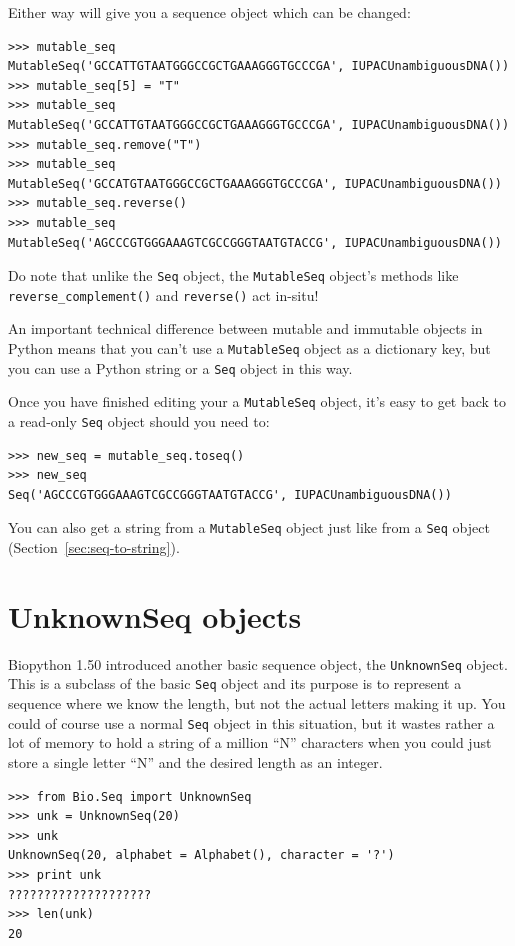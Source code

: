 \documentclass{report}
\begin{document}
Either way will give you a sequence object which can be changed:
\begin{verbatim}
>>> mutable_seq
MutableSeq('GCCATTGTAATGGGCCGCTGAAAGGGTGCCCGA', IUPACUnambiguousDNA())
>>> mutable_seq[5] = "T"
>>> mutable_seq
MutableSeq('GCCATTGTAATGGGCCGCTGAAAGGGTGCCCGA', IUPACUnambiguousDNA())
>>> mutable_seq.remove("T")
>>> mutable_seq
MutableSeq('GCCATGTAATGGGCCGCTGAAAGGGTGCCCGA', IUPACUnambiguousDNA())
>>> mutable_seq.reverse()
>>> mutable_seq
MutableSeq('AGCCCGTGGGAAAGTCGCCGGGTAATGTACCG', IUPACUnambiguousDNA())
\end{verbatim}

Do note that unlike the \verb|Seq| object, the \verb|MutableSeq| object's methods like \verb|reverse_complement()| and \verb|reverse()| act in-situ!

An important technical difference between mutable and immutable objects in Python means that you can't use a \verb|MutableSeq| object as a dictionary key, but you can use a Python string or a \verb|Seq| object in this way.

Once you have finished editing your a \verb|MutableSeq| object, it's easy to get back to a read-only \verb|Seq| object should you need to:

\begin{verbatim}
>>> new_seq = mutable_seq.toseq()
>>> new_seq
Seq('AGCCCGTGGGAAAGTCGCCGGGTAATGTACCG', IUPACUnambiguousDNA())
\end{verbatim}

You can also get a string from a \verb|MutableSeq| object just like from a \verb|Seq| object (Section~\ref{sec:seq-to-string}).

\section{UnknownSeq objects}
Biopython 1.50 introduced another basic sequence object, the \verb|UnknownSeq| object.
This is a subclass of the basic \verb|Seq| object and its purpose is to represent a
sequence where we know the length, but not the actual letters making it up.
You could of course use a normal \verb|Seq| object in this situation, but it wastes
rather a lot of memory to hold a string of a million ``N'' characters when you could
just store a single letter ``N'' and the desired length as an integer.

\begin{verbatim}
>>> from Bio.Seq import UnknownSeq
>>> unk = UnknownSeq(20)
>>> unk
UnknownSeq(20, alphabet = Alphabet(), character = '?')
>>> print unk
????????????????????
>>> len(unk)
20
\end{verbatim}
\end{document}
